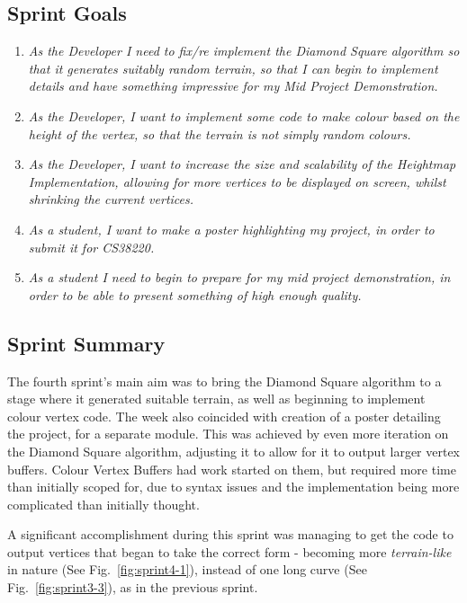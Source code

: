 \documentclass[a4paper,10pt]{report}
\begin{document}
\subsection{Sprint Goals}
\begin{enumerate}
    \item \textit{As the Developer I need to fix/re implement the Diamond Square algorithm so that it generates suitably random terrain, so that I can begin to implement details and have something impressive for my Mid Project Demonstration. }
    \item \textit{As the Developer, I want to implement some code to make colour based on the height of the vertex, so that the terrain is not simply random colours.}
    \item \textit{As the Developer, I want to increase the size and scalability of the Heightmap Implementation, allowing for more vertices to be displayed on screen, whilst shrinking the current vertices. }
    \item \textit{As a student, I want to make a poster highlighting my project, in order to submit it for CS38220.}
    \item \textit{As a student I need to begin to prepare for my mid project demonstration, in order to be able to present something of high enough quality. }
    
\end{enumerate}
\subsection{Sprint Summary}

The fourth sprint's main aim was to bring the Diamond Square algorithm to a stage where it generated suitable terrain, as well as beginning to implement colour vertex code. The week also coincided with creation of a poster detailing the project, for a separate module. This was achieved by even more iteration on the Diamond Square algorithm, adjusting it to allow for it to output larger vertex buffers. Colour Vertex Buffers had work started on them, but required more time than initially scoped for, due to syntax issues and the implementation being more complicated than initially thought.  \medskip

A significant accomplishment during this sprint was managing to get the code to output vertices that began to take the correct form - becoming more \textit{terrain-like} in nature (See Fig.~\ref{fig:sprint4-1}), instead of one long curve (See Fig.~\ref{fig:sprint3-3}), as in the previous sprint. 
\end{document}
